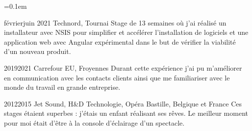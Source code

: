 \begin{indentsection}{\parindent}
  \parskip=0.1em
  \item[]
  {février}{juin 2021}
  {Technord, Tournai}
  {Stage de 13 semaines où j’ai réalisé un installateur avec NSIS pour simplifier et accélérer l’installation de logiciels et une application web avec Angular expérimental dans le but de vérifier la viabilité d’un nouveau produit.}

  \item[]
  {2019}{2021}
  {Carrefour EU, Froyennes}
  {Durant cette expérience j'ai pu m'améliorer en communication avec les contacts clients ainsi que me familiariser avec le monde du travail en grande entreprise.}

  \item[]
  {2012}{2015}
  {Jet Sound, H\&D Technologie, Opéra Bastille, Belgique et France}
  {Ces stages étaient superbes : j'étais un enfant réalisant ses rêves. Le meilleur moment pour moi était d'être à la console d'éclairage d'un spectacle.}
\end{indentsection}
